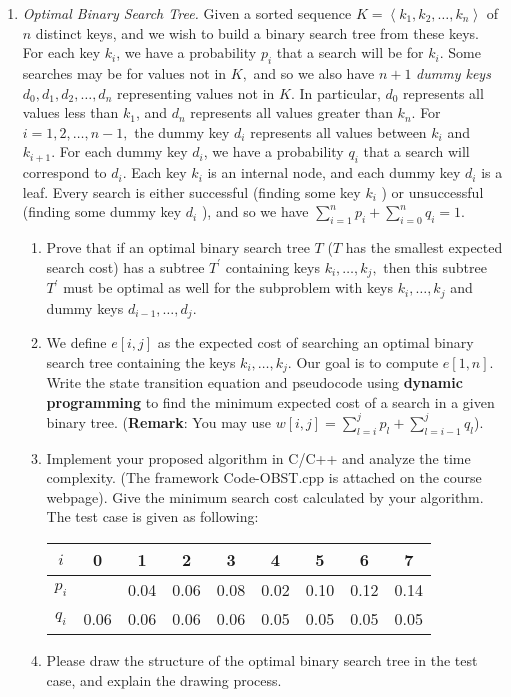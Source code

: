 \documentclass[12pt,a4paper]{article}
\theoremstyle{definition}
\begin{document}
	\begin{enumerate}
		\item \textit{Optimal Binary Search Tree.} Given a sorted sequence $K=\left \langle k_{1}, k_{2}, \ldots, k_{n} \right \rangle$ of $n$ distinct keys, and we wish to build a binary search tree from these keys. For each key $k_{i}$, we have a probability $p_{i}$ that a search will be for $k_{i}$. Some searches may be for values not in $K,$ and so we also have $n+1$ \emph{dummy keys} $d_{0}, d_{1}, d_{2}, \ldots, d_{n}$ representing values not in $K$. In particular, $d_{0}$ represents all values less than $k_{1}$, and $d_{n}$ represents all values greater than $k_{n}$. For $i=1,2, \ldots, n-1,$ the dummy key $d_{i}$ represents all values between $k_{i}$ and $k_{i+1}$. For each dummy key $d_{i}$, we have a probability $q_{i}$ that a search will correspond to $d_{i}$. Each key $k_{i}$ is an internal node, and each dummy key $d_{i}$ is a leaf. Every search is either successful (finding some key $k_{i}$ ) or unsuccessful (finding some dummy key $d_{i}$ ), and so we have $ \sum_{i=1}^{n} p_{i}+\sum_{i=0}^{n} q_{i}=1 $. 
		\begin{enumerate}
			\item Prove that if an optimal binary search tree $T$ ($ T $ has the smallest expected search cost) has a subtree $T^{\prime}$ containing keys $k_{i}, \ldots, k_{j},$ then this subtree $T^{\prime}$ must be optimal as well for the subproblem with keys $k_{i}, \ldots, k_{j}$ and dummy keys $d_{i-1}, \ldots, d_{j}$. 
			\item We define $e[i, j]$ as the expected cost of searching an optimal binary search tree containing the keys $k_{i}, \ldots, k_{j} .$ Our goal is to compute $e[1, n]$. Write the state transition equation and pseudocode using \textbf{dynamic programming} to find
			the minimum expected cost of a search in a given binary tree. (\textbf{Remark}: You may use $ w[i, j]=\sum_{l=i}^{j} p_{l}+\sum_{l=i-1}^{j} q_{l} $).
			\item Implement your proposed algorithm in C/C++ and analyze the time complexity. ({\color{blue}The framework Code-OBST.cpp is attached on the course webpage}). Give the minimum search cost calculated by your algorithm. The test case is given as following:
			\begin{table}[H]
				\setlength{\abovecaptionskip}{0cm}
				\setlength{\belowcaptionskip}{0.1cm}
				\centering		
				\begin{tabular}{|c|cccccccc|}
					\hline
					$ i $&0&1&2&3&4&5&6&7\\
					\hline
					$ p_{i} $&&0.04&0.06&0.08&0.02&0.10&0.12&0.14\\
					\hline
					$ q_{i} $&0.06&0.06&0.06&0.06&0.05&0.05&0.05&0.05\\
					\hline
				\end{tabular}
			\end{table}
			\item Please draw the structure of the optimal binary search tree in the test case, and explain the drawing process.   
		\end{enumerate}
		

\end{enumerate}
\end{document}
